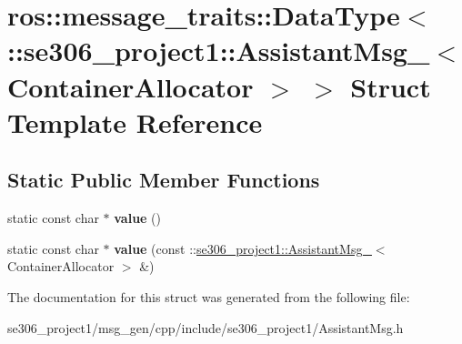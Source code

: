 \hypertarget{structros_1_1message__traits_1_1DataType_3_01_1_1se306__project1_1_1AssistantMsg___3_01ContainerAllocator_01_4_01_4}{\section{ros\-:\-:message\-\_\-traits\-:\-:Data\-Type$<$ \-:\-:se306\-\_\-project1\-:\-:Assistant\-Msg\-\_\-$<$ Container\-Allocator $>$ $>$ Struct Template Reference}
\label{structros_1_1message__traits_1_1DataType_3_01_1_1se306__project1_1_1AssistantMsg___3_01ContainerAllocator_01_4_01_4}
}
\subsection*{Static Public Member Functions}
\begin{DoxyCompactItemize}
\item 
\hypertarget{structros_1_1message__traits_1_1DataType_3_01_1_1se306__project1_1_1AssistantMsg___3_01ContainerAllocator_01_4_01_4_ae0a879b4dd29f9b66a0d0f1ea073a641}{static const char $\ast$ {\bfseries value} ()}\label{structros_1_1message__traits_1_1DataType_3_01_1_1se306__project1_1_1AssistantMsg___3_01ContainerAllocator_01_4_01_4_ae0a879b4dd29f9b66a0d0f1ea073a641}

\item 
\hypertarget{structros_1_1message__traits_1_1DataType_3_01_1_1se306__project1_1_1AssistantMsg___3_01ContainerAllocator_01_4_01_4_ad7010538055bae2cac07b2f8192b4bc1}{static const char $\ast$ {\bfseries value} (const \-::\hyperlink{structse306__project1_1_1AssistantMsg__}{se306\-\_\-project1\-::\-Assistant\-Msg\-\_\-}$<$ Container\-Allocator $>$ \&)}\label{structros_1_1message__traits_1_1DataType_3_01_1_1se306__project1_1_1AssistantMsg___3_01ContainerAllocator_01_4_01_4_ad7010538055bae2cac07b2f8192b4bc1}

\end{DoxyCompactItemize}


The documentation for this struct was generated from the following file\-:\begin{DoxyCompactItemize}
\item 
se306\-\_\-project1/msg\-\_\-gen/cpp/include/se306\-\_\-project1/Assistant\-Msg.\-h\end{DoxyCompactItemize}
